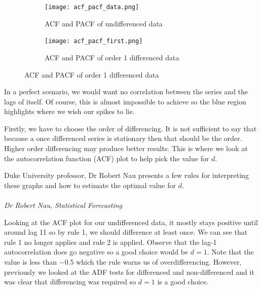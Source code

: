\documentclass{article}
\begin{document}
  \begin{figure}[H]
    \centering
    \captionsetup{justification=centering}
    \begin{subfigure}[b]{\linewidth}
      \texttt{[image: acf\_pacf\_data.png]}
      \caption{ACF and PACF of undifferenced data}
    \end{subfigure}
    \begin{subfigure}[b]{\linewidth}
      \texttt{[image: acf\_pacf\_first.png]}
      \caption{ACF and PACF of order 1 differenced data}
    \end{subfigure}
  \end{figure}
  

  In a perfect scenario, we would want no correlation between the series and the lags of itself. Of course, this is almost impossible to achieve so the blue region highlights where we wish our spikes to lie. 

  Firstly, we have to choose the order of differencing. It is not sufficient to say that because a once differenced series is stationary then that should be the order. Higher order differencing may produce better results. This is where we look at the autocorrelation function (ACF) plot to help pick the value for $d$. 

  Duke University professor, Dr Robert Nau presents a few rules for interpreting these graphs and how to estimate the optimal value for $d$.
  \newline
  \newline
  \emph{\\
  \\
  Dr Robert Nau, Statistical Forecasting}
  \newline

  Looking at the ACF plot for our undifferenced data, it mostly stays positive until around lag 11 so by rule 1, we should difference at least once. We can see that rule 1 no longer applies and rule 2 is applied. Observe that the lag-1 autocorrelation does go negative so a good choice would be $d=1$. Note that the value is less than $-0.5$ which the rule warns us of overdifferencing. However, previously we looked at the ADF tests for differenced and non-differenced and it was clear that differencing was required so $d=1$ is a good choice.
\end{document}
